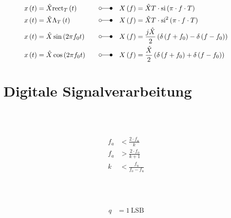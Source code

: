 \begin{boxleft}
\end{boxleft}\begin{boxrightshaded}
\begin{align*}
x\left(t\right)&=\hat{X}\mathrm{rect}_{T}\left(t\right)\quad&\laplace\quad X\left(f\right)&=\hat{X}T\cdot\mathrm{si}\left(\pi\cdot f\cdot T\right)\\
x\left(t\right)&=\hat{X}\Lambda_{T}\left(t\right)\quad&\laplace\quad X\left(f\right)&=\hat{X}T\cdot\mathrm{si}^2\left(\pi\cdot f\cdot T\right)\\
x\left(t\right)&=\hat{X}\sin\left(2\pi f_0 t\right)\quad&\laplace\quad X\left(f\right)&=\frac{j\hat{X}}{2}\left(\delta\left(f+f_0\right)-\delta\left(f-f_0\right)\right)\\
x\left(t\right)&=\hat{X}\cos\left(2\pi f_0 t\right)\quad&\laplace\quad X\left(f\right)&=\frac{\hat{X}}{2}\left(\delta\left(f+f_0\right)+\delta\left(f-f_0\right)\right)
\end{align*}
\end{boxrightshaded}


\section{Digitale Signalverarbeitung}


\begin{boxleft}
\\
\\
\end{boxleft}\begin{boxrightshaded}
\begin{align*}
f_a & < \frac{2\cdot f_u}{k}\\
f_a & > \frac{2\cdot f_o}{k+1}\\
k &<\frac{f_u}{f_o-f_u}
\end{align*}
\end{boxrightshaded}

\begin{boxleft}
\\
\\
\end{boxleft}\begin{boxrightshaded}
\begin{align*}
q&=1 ~\text{LSB}
\end{align*}
\end{boxrightshaded}